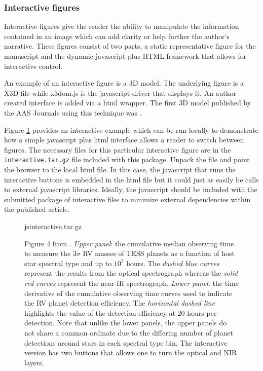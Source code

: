 \documentclass[linenumbers]{aastex631}
\begin{document}
\subsubsection{Interactive figures \label{sec:interactive}}

Interactive figures give the reader the ability to manipulate the
information contained in an image which can add clarity or help further the
author's narrative.  These figures consist of two parts, a static 
representative figure for the manuscript and the dynamic javascript plus
HTML framework that allows for interactive control.

An example of an interactive figure is a 3D model.
The underlying figure is a X3D file while x3dom.js is the javascript driver
that displays it. An author created interface is added via a html wrapper.
The first 3D model published by the AAS Journals using this technique was
\citet{2014ApJ...793..127V}.  

Figure \ref{fig:interactive} provides an interactive example which can be
run locally to demonstrate how a simple javascript plus html interface
allows a reader to switch between figures. The necessary files for this
particular interactive figure are in the {\tt\string interactive.tar.gz}
file included with this package. Unpack the file and point the browser to
the local html file. In this case, the javascript that runs the interactive
buttons is embedded in the html file but it could just as easily be calls
to external javascript libraries. Ideally, the javascript should be
included with the submitted package of interactive files to minimize
external dependencies within the published article.

\begin{figure}
\begin{interactive}{js}{interactive.tar.gz}
\end{interactive}
\caption{Figure 4 from \citet{2018AJ....156...82C}. \emph{Upper panel}: the
cumulative median observing time to measure the $3\sigma$ RV masses of TESS
planets as a function of host star spectral type and up to $10^3$ hours.
The \emph{dashed blue curves} represent the results from the optical
spectrograph whereas the \emph{solid red curves} represent the near-IR
spectrograph. \emph{Lower panel}: the time derivative of the cumulative
observing time curves used to indicate the RV planet detection efficiency.
The \emph{horizontal dashed line} highlights the value of the detection
efficiency at 20 hours per detection.  Note that unlike the lower panels,
the upper panels do not share a common ordinate due to the differing number
of planet detections around stars in each spectral type bin. The
interactive version has two buttons that allows one to turn the optical and
NIR layers. \label{fig:interactive}}
\end{figure}
\end{document}
